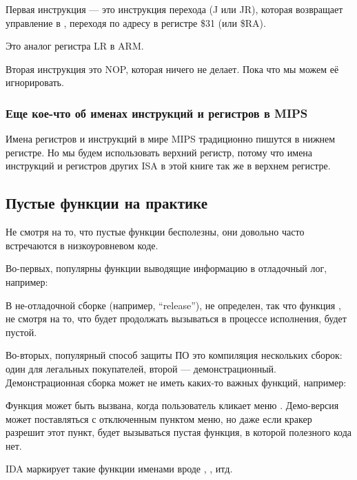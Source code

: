 
Первая инструкция --- это инструкция перехода (J или JR),
которая возвращает управление в , переходя по адресу в регистре \$31 (или \$RA).

Это аналог регистра \ac{LR} в ARM.

Вторая инструкция это \ac{NOP}, которая ничего не делает.
Пока что мы можем её игнорировать.

\subsubsection{Еще кое-что об именах инструкций и регистров в MIPS}
Имена регистров и инструкций в мире MIPS традиционно пишутся в нижнем регистре.
Но мы будем использовать верхний регистр, потому что имена инструкций и регистров других
\ac{ISA} в этой книге так же в верхнем регистре.

\subsection{Пустые функции на практике}

Не смотря на то, что пустые функции бесполезны, они довольно часто встречаются в низкоуровневом коде.

Во-первых, популярны функции выводящие информацию в отладочный лог, например:



В не-отладочной сборке (например, ``release''),  не определен, так что функция ,
не смотря на то, что будет продолжать вызываться в процессе исполнения, будет пустой.

Во-вторых, популярный способ защиты ПО это компиляция нескольких сборок: один для легальных покупателей,
второй --- демонстрационный.
Демонстрационная сборка может не иметь каких-то важных функций, например:



Функция  может быть вызвана, когда пользователь кликает меню .
Демо-версия может поставляться с отключенным пунктом меню, но даже если кракер разрешит этот пункт,
будет вызываться пустая функция, в которой полезного кода нет.

IDA маркирует такие функции именами вроде , , итд.

